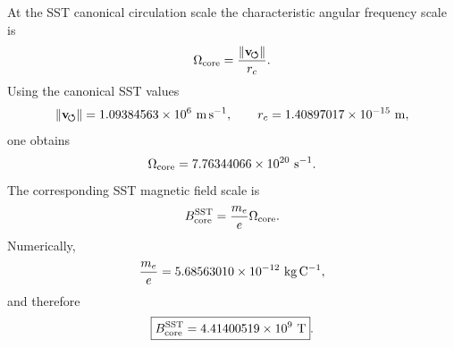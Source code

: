    At the SST canonical circulation scale the characteristic angular frequency scale is
    \begin{equation}
        \Omega_{\rm core}
        =
        \frac{\lVert\mathbf{v}_{\!\boldsymbol{\circlearrowleft}}\rVert}{r_c}.
        \label{eq:omega_core}
    \end{equation}
    Using the canonical SST values
    \begin{equation}
        \lVert\mathbf{v}_{\!\boldsymbol{\circlearrowleft}}\rVert
        =
        1.09384563\times10^{6}\ {\rm m\,s^{-1}},
        \qquad
        r_c
        =
        1.40897017\times10^{-15}\ {\rm m},
    \end{equation}
    one obtains
    \begin{equation}
        \Omega_{\rm core}
        =
        7.76344066\times10^{20}\ {\rm s^{-1}}.
        \label{eq:omega_core_numeric}
    \end{equation}
    The corresponding SST magnetic field scale is
    \begin{equation}
        B_{\rm core}^{\rm SST}
        =
        \frac{m_e}{e}\Omega_{\rm core}.
        \label{eq:Bcore_sst}
    \end{equation}
    Numerically,
    \begin{equation}
        \frac{m_e}{e}
        =
        5.68563010\times10^{-12}\ {\rm kg\,C^{-1}},
    \end{equation}
    and therefore
    \begin{equation}
        \boxed{
            B_{\rm core}^{\rm SST}
            =
            4.41400519\times10^{9}\ {\rm T}
        } .
        \label{eq:Bcore_numeric}
    \end{equation}
    
